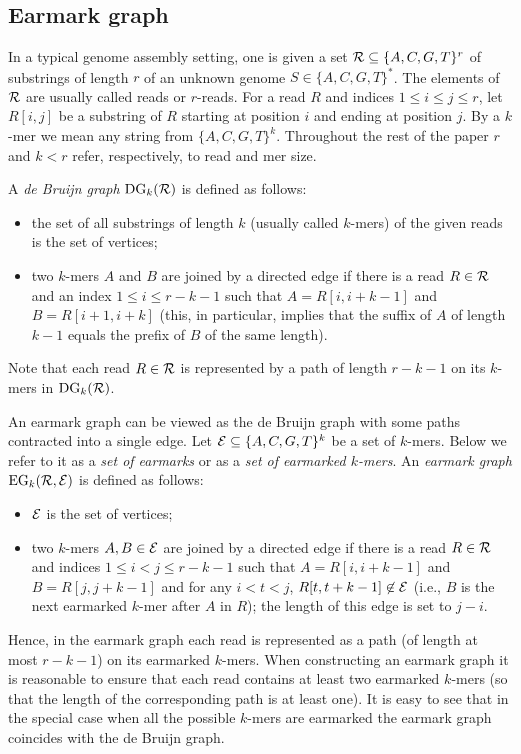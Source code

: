 \documentclass[17pt]{extarticle}
\theoremstyle{definition}
\begin{document}
\begin{multicols}{2}
\section{Earmark graph}
In a typical genome assembly setting, one is given a set 
${\cal R} \subseteq \{A,C,G,T\}^r$ 
of substrings of length $r$ of an unknown genome $S \in \{A,C,G,T\}^*$.
The elements of ${\cal R}$ are usually called reads or $r$-reads.
For a read $R$ and indices $1 \le i \le j \le r$,
let $R[i,j]$ be a substring of $R$ starting at position $i$
and ending at position $j$. By a $k$-mer we mean any string from
$\{A,C,G,T\}^k$. Throughout the rest of the paper $r$ and $k<r$
refer, respectively, to read and mer size.

A \emph{de Bruijn graph} $\textrm{DG}_k({\cal R})$ is defined as follows:
\begin{itemize}
\item the set of all substrings of length $k$ (usually called $k$-mers) of the given reads is the 
set of vertices; 
\item two $k$-mers $A$ and $B$ are joined by a directed edge if there is a
read $R \in {\cal R}$ and an index $1 \le i \le r-k-1$ such that
$A=R[i,i+k-1]$ and $B=R[i+1,i+k]$
(this, in particular, implies that
the suffix of $A$ of length $k-1$ equals the prefix of $B$ of the same length).
\end{itemize}
Note that each read $R \in {\cal R}$ is represented by a path of length $r-k-1$
on its $k$-mers in $\textrm{DG}_k({\cal R})$.


An earmark graph can be viewed as the de Bruijn graph
with some paths contracted into a single edge.
Let ${\cal E} \subseteq \{A,C,G,T\}^k$ be a set of $k$-mers.
Below we refer to it as a \emph{set of earmarks} or as a \emph{set of earmarked $k$-mers}. 
An \emph{earmark graph} $\textrm{EG}_k({\cal R}, {\cal E})$ is defined as follows:
\begin{itemize}
\item ${\cal E}$ is the set of vertices;
\item two $k$-mers $A, B \in {\cal E}$ are joined by a directed edge if there is a read $R \in {\cal R}$
and indices $1 \le i < j \le r-k-1$ such that
$A=R[i,i+k-1]$ and $B=R[j,j+k-1]$ and 
for any $i < t < j$, $R[t,t+k-1] \not \in {\cal E}$
(i.e., $B$ is the next earmarked $k$-mer after $A$ in $R$); the length of this edge is set to
$j-i$.
\end{itemize}
Hence, in the earmark graph each read is represented as a path (of length at most $r-k-1$) on its earmarked $k$-mers.
When constructing an earmark graph it is reasonable to ensure that each read contains at least two 
earmarked $k$-mers (so that the length of the corresponding path is at least one).
It is easy to see that in the special case when all the possible $k$-mers are earmarked
the earmark graph coincides with the de Bruijn graph.


\end{multicols}
\end{document}
